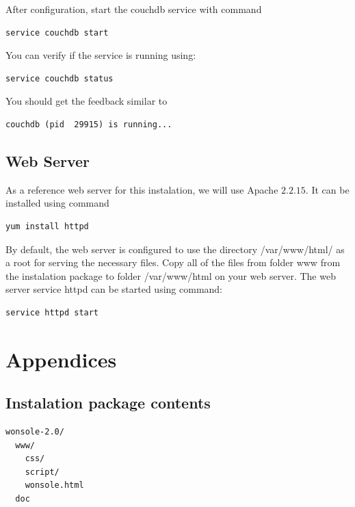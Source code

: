 \documentclass[10pt,a4paper,oneside]{report}
\begin{document}
After configuration, start the couchdb service with command
\begin{verbatim}
service couchdb start
\end{verbatim}
You can verify if the service is running using:
\begin{verbatim}
service couchdb status
\end{verbatim}
You should get the feedback similar to
\begin{verbatim}
couchdb (pid  29915) is running...
\end{verbatim}
\section{Web Server}
As a reference web server for this instalation, we will use Apache $2.2.15$. It
can be installed using command
\begin{verbatim}
yum install httpd
\end{verbatim}
By default, the web server is configured to use the directory /var/www/html/ as
a root for serving the necessary files. Copy all of the files from folder www from
the instalation package to folder /var/www/html on your web server.
The web server service httpd can be started using command:
\begin{verbatim}
service httpd start
\end{verbatim}


\chapter{Appendices}
\section{Instalation package contents}
\begin{verbatim}
wonsole-2.0/
  www/
    css/
    script/
    wonsole.html
  doc
\end{verbatim}
\end{document}
